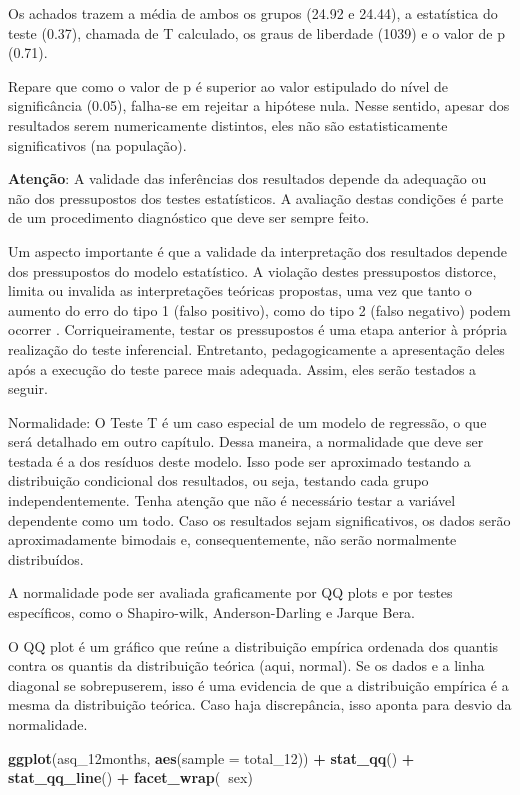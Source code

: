 \documentclass[
]{book}
\newenvironment{Shaded}{\begin{snugshade}}{\end{snugshade}}
\newcommand{\DataTypeTok}[1]{\textcolor[rgb]{0.13,0.29,0.53}{#1}}
\newcommand{\DecValTok}[1]{\textcolor[rgb]{0.00,0.00,0.81}{#1}}
\newcommand{\KeywordTok}[1]{\textcolor[rgb]{0.13,0.29,0.53}{\textbf{#1}}}
\newcommand{\NormalTok}[1]{#1}
\newcommand{\OperatorTok}[1]{\textcolor[rgb]{0.81,0.36,0.00}{\textbf{#1}}}
\newcommand{\StringTok}[1]{\textcolor[rgb]{0.31,0.60,0.02}{#1}}
\begin{document}
Os achados trazem a média de ambos os grupos (24.92 e 24.44), a estatística do teste (0.37), chamada de T calculado, os graus de liberdade (1039) e o valor de p (0.71).

Repare que como o valor de p é superior ao valor estipulado do nível de significância (0.05), falha-se em rejeitar a hipótese nula. Nesse sentido, apesar dos resultados serem numericamente distintos, eles não são estatisticamente significativos (na população).

\textbf{Atenção}: A validade das inferências dos resultados depende da adequação ou não dos pressupostos dos testes estatísticos. A avaliação destas condições é parte de um procedimento diagnóstico que deve ser sempre feito.

Um aspecto importante é que a validade da interpretação dos resultados depende dos pressupostos do modelo estatístico. A violação destes pressupostos distorce, limita ou invalida as interpretações teóricas propostas, uma vez que tanto o aumento do erro do tipo 1 (falso positivo), como do tipo 2 (falso negativo) podem ocorrer \citep{Lix1996, Barker2015, Ernst2017}. Corriqueiramente, testar os pressupostos é uma etapa anterior à própria realização do teste inferencial. Entretanto, pedagogicamente a apresentação deles após a execução do teste parece mais adequada. Assim, eles serão testados a seguir.

Normalidade: O Teste T é um caso especial de um modelo de regressão, o que será detalhado em outro capítulo. Dessa maneira, a normalidade que deve ser testada é a dos resíduos deste modelo. Isso pode ser aproximado testando a distribuição condicional dos resultados, ou seja, testando cada grupo independentemente. Tenha atenção que não é necessário testar a variável dependente como um todo. Caso os resultados sejam significativos, os dados serão aproximadamente bimodais e, consequentemente, não serão normalmente distribuídos.

A normalidade pode ser avaliada graficamente por QQ plots e por testes específicos, como o Shapiro-wilk, Anderson-Darling e Jarque Bera.

O QQ plot é um gráfico que reúne a distribuição empírica ordenada dos quantis contra os quantis da distribuição teórica (aqui, normal). Se os dados e a linha diagonal se sobrepuserem, isso é uma evidencia de que a distribuição empírica é a mesma da distribuição teórica. Caso haja discrepância, isso aponta para desvio da normalidade.

\begin{Shaded}
\begin{Highlighting}[]
\KeywordTok{ggplot}\NormalTok{(asq_12months, }\KeywordTok{aes}\NormalTok{(}\DataTypeTok{sample =}\NormalTok{ total_}\DecValTok{12}\NormalTok{)) }\OperatorTok{+}\StringTok{ }
\StringTok{  }\KeywordTok{stat_qq}\NormalTok{() }\OperatorTok{+}\StringTok{ }
\StringTok{  }\KeywordTok{stat_qq_line}\NormalTok{() }\OperatorTok{+}
\StringTok{  }\KeywordTok{facet_wrap}\NormalTok{(}\OperatorTok{~}\NormalTok{sex)}
\end{Highlighting}
\end{Shaded}
\end{document}
